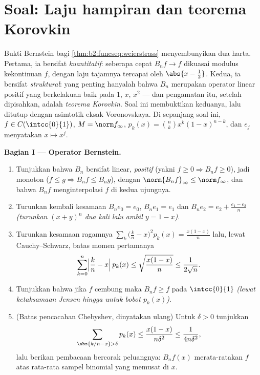 \section{Soal: Laju hampiran dan teorema Korovkin}

\begin{problem}\label{pb:b2:funcseq:1}
Bukti Bernstein bagi \cref{thm:b2:funcseq:weierstrass} menyembunyikan
dua harta. Pertama, ia bersifat \emph{kuantitatif}: seberapa cepat $B_nf
\to f$ dikuasai modulus kekontinuan $f$, dengan laju tajamnya
tercapai oleh $\abs{x - \frac12}$. Kedua, ia bersifat
\emph{struktural}: yang penting hanyalah bahwa $B_n$ merupakan
operator linear positif yang berkelakuan baik pada $1$, $x$, $x^2$ ---
dan pengamatan itu, setelah dipisahkan, adalah \emph{teorema
Korovkin}. Soal ini membuktikan keduanya,
lalu ditutup dengan asimtotik eksak Voronovskaya. Di sepanjang soal ini,
$f \in C(\intcc{0}{1})$, $M = \norm f_\infty$, $p_k(x) = \binom
nk x^k(1-x)^{n-k}$, dan $e_j$ menyatakan $x \mapsto x^j$.

\medskip
\noindent\textbf{Bagian I --- Operator Bernstein.}
\begin{enumerate}
  \item Tunjukkan bahwa $B_n$ bersifat linear, \emph{positif} (yakni $f
        \geq 0 \Rightarrow B_nf \geq 0$), jadi monoton ($f \leq g
        \Rightarrow B_nf \leq B_ng$), dengan
        $\norm{B_nf}_\infty \leq \norm f_\infty$, dan bahwa
        $B_nf$ menginterpolasi $f$ di kedua ujungnya.
  \item Turunkan kembali kesamaan $B_n e_0 = e_0$, $B_n e_1 =
        e_1$ dan $B_n e_2 = e_2 + \frac{e_1 - e_2}{n}$
        \emph{(turunkan $(x + y)^n$ dua kali lalu ambil $y = 1 - x$)}.
  \item Turunkan kesamaan ragamnya $\sum_k \bigl(\frac kn -
        x\bigr)^2 p_k(x) = \frac{x(1-x)}{n}$ lalu, lewat
        Cauchy--Schwarz, batas momen pertamanya
        \[
        \sum_{k=0}^{n}\Bigl|\frac kn - x\Bigr|\,p_k(x)
        \leq \sqrt{\frac{x(1-x)}{n}} \leq \frac{1}{2\sqrt n} .
        \]
  \item Tunjukkan bahwa jika $f$ cembung maka $B_nf \geq f$ pada
        $\intcc{0}{1}$ \emph{(lewat ketaksamaan Jensen hingga untuk
        bobot $p_k(x)$)}.
  \item (Batas pencacahan Chebyshev, dinyatakan ulang) Untuk $\delta > 0$
        tunjukkan
        \[
        \sum_{\abs{k/n - x} > \delta} p_k(x)
        \leq \frac{x(1-x)}{n\delta^2}
        \leq \frac{1}{4n\delta^2} ,
        \]
        lalu berikan pembacaan bercorak peluangnya: $B_nf(x)$
        merata-ratakan $f$ atas rata-rata sampel binomial yang memusat di $x$.
\end{enumerate}


\end{problem}
